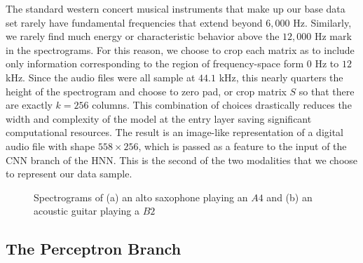 \documentclass[conference,onecolumn,letterpaper]{IEEEtran}
\begin{document}
The standard western concert musical instruments that make up our base data set rarely have fundamental frequencies that extend beyond $6,000$ Hz. Similarly, we rarely find much energy or characteristic behavior above the $12,000$ Hz mark in the spectrograms. For this reason, we choose to crop each matrix as to include only information corresponding to the region of frequency-space form $0$ Hz to $12$ kHz. Since the audio files were all sample at $44.1$ kHz, this nearly quarters the height of the spectrogram and choose to zero pad, or crop matrix $S$ so that there are exactly $k = 256$ columns. This combination of choices drastically reduces the width and complexity of the model at the entry layer saving significant computational resources. The result is an image-like representation of a digital audio file with shape $558 \times 256$, which is passed as a feature to the input of the CNN branch of the HNN. This is the second of the two modalities that we choose to represent our data sample.

\begin{figure}[h]
    \centering
    \caption{Spectrograms of (a) an alto saxophone playing an $A4$ and (b) an acoustic guitar playing a $B2$}
    \label{fig:Example Spectrograms}
\end{figure}


\subsection{The Perceptron Branch}
\label{subsec:MLP}
\end{document}
